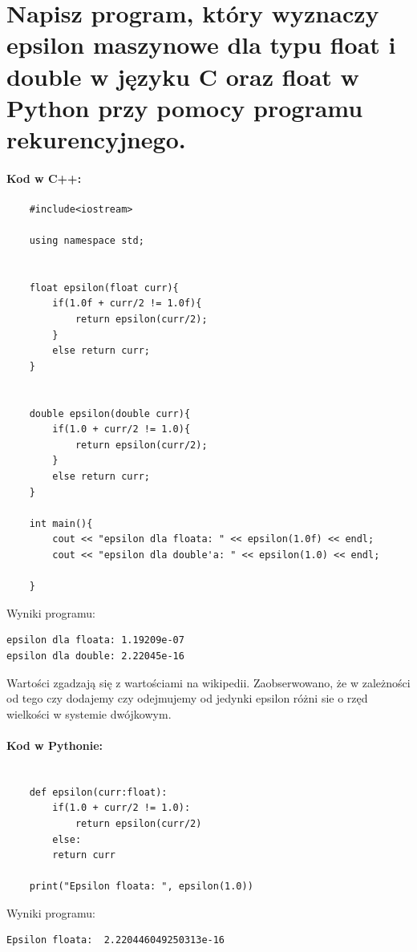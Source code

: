 \section{Napisz program, który wyznaczy epsilon maszynowe dla typu float i double w języku C oraz float w Python przy pomocy programu rekurencyjnego.
}

\paragraph{Kod w C++:}

\begin{verbatim}
	#include<iostream>

	using namespace std;


	float epsilon(float curr){
		if(1.0f + curr/2 != 1.0f){
			return epsilon(curr/2);
		}
		else return curr;
	}


	double epsilon(double curr){
		if(1.0 + curr/2 != 1.0){
			return epsilon(curr/2);
		}
		else return curr;
	}

	int main(){
		cout << "epsilon dla floata: " << epsilon(1.0f) << endl;
		cout << "epsilon dla double'a: " << epsilon(1.0) << endl;

	}
\end{verbatim}


Wyniki programu:

\begin{lstlisting}
epsilon dla floata: 1.19209e-07
epsilon dla double: 2.22045e-16
\end{lstlisting}


Wartości zgadzają się z wartościami na wikipedii. Zaobserwowano, że w zależności od tego czy dodajemy czy odejmujemy od jedynki epsilon różni sie o rzęd wielkości w systemie dwójkowym.
\clearpage
\newpage
\paragraph{Kod w Pythonie:}

\begin{verbatim}
	
	def epsilon(curr:float):
		if(1.0 + curr/2 != 1.0):
			return epsilon(curr/2)
		else: 
		return curr
	
	print("Epsilon floata: ", epsilon(1.0))
\end{verbatim}

Wyniki programu:

\begin{lstlisting}
Epsilon floata:  2.220446049250313e-16
\end{lstlisting}

